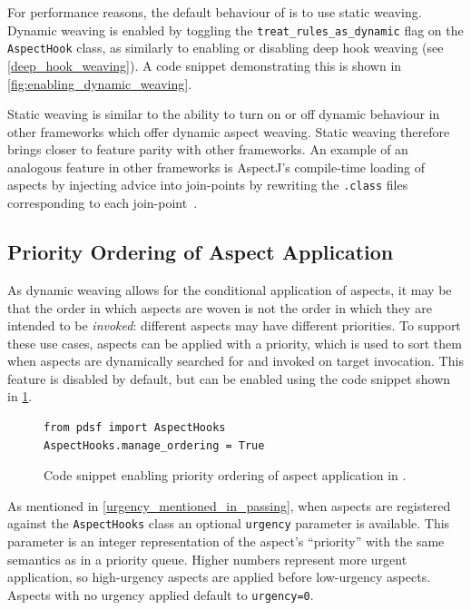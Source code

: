 For performance reasons, the default behaviour of \pdsfthree is to use static
weaving. Dynamic weaving is enabled by toggling the
\lstinline{treat_rules_as_dynamic} flag on the \lstinline{AspectHook} class, as
similarly to enabling or disabling deep hook weaving (see
\cref{deep_hook_weaving}). A code snippet demonstrating this is shown in
\cref{fig:enabling_dynamic_weaving}.

Static weaving is similar to the ability to turn on or off dynamic behaviour in
other \aop frameworks which offer dynamic aspect weaving. Static weaving
therefore brings \pdsfthree closer to feature parity with other \aop frameworks.
An example of an analogous feature in other frameworks is AspectJ's compile-time
loading of aspects by injecting advice into join-points by rewriting the
\lstinline{.class} files corresponding to each
join-point~\cite{aspectj-bytecode-weaving-documentation}. 

\subsection{Priority Ordering of Aspect Application}
\label{aspect_priority_support}

As dynamic weaving allows for the conditional application of aspects, it may be
that the order in which aspects are woven is not the order in which they are
intended to be \emph{invoked}: different aspects may have different priorities.
To support these use cases, aspects can be applied with a priority, which is
used to sort them when aspects are dynamically searched for and invoked on
target invocation. This feature is disabled by default, but can be enabled using
the code snippet shown in \cref{fig:enabling_priority_sorting_of_aspects}.

\begin{figure}[h]
    \begin{lstlisting}[style=footnotesize_python]
from pdsf import AspectHooks
AspectHooks.manage_ordering = True
    \end{lstlisting}
    \caption{Code snippet enabling priority ordering of aspect application in \pdsfthree{}.}
    \label{fig:enabling_priority_sorting_of_aspects}
\end{figure}

As mentioned in \cref{urgency_mentioned_in_passing}, when aspects are registered
against the \lstinline{AspectHooks} class an optional \lstinline{urgency}
parameter is available. This parameter is an integer representation of the
aspect's ``priority'' with the same semantics as in a priority queue. Higher
numbers represent more urgent application, so high-urgency aspects are applied
before low-urgency aspects. Aspects with no urgency applied default to
\lstinline{urgency=0}.

